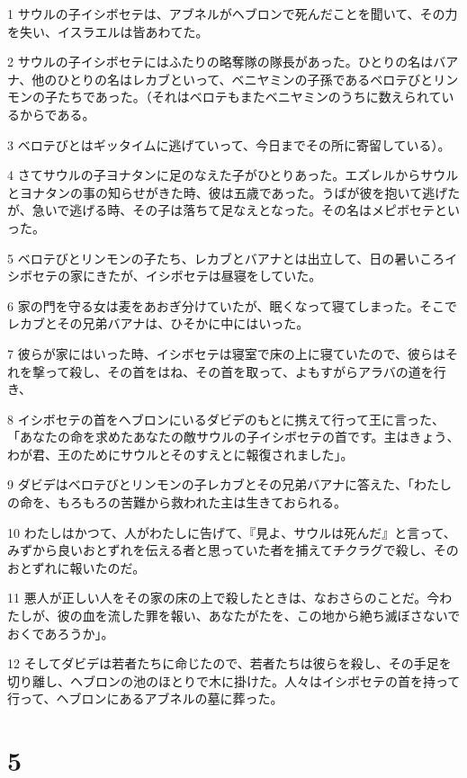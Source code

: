 \par 1 サウルの子イシボセテは、アブネルがヘブロンで死んだことを聞いて、その力を失い、イスラエルは皆あわてた。
\par 2 サウルの子イシボセテにはふたりの略奪隊の隊長があった。ひとりの名はバアナ、他のひとりの名はレカブといって、ベニヤミンの子孫であるベロテびとリンモンの子たちであった。（それはベロテもまたベニヤミンのうちに数えられているからである。
\par 3 ベロテびとはギッタイムに逃げていって、今日までその所に寄留している）。
\par 4 さてサウルの子ヨナタンに足のなえた子がひとりあった。エズレルからサウルとヨナタンの事の知らせがきた時、彼は五歳であった。うばが彼を抱いて逃げたが、急いで逃げる時、その子は落ちて足なえとなった。その名はメピボセテといった。
\par 5 ベロテびとリンモンの子たち、レカブとバアナとは出立して、日の暑いころイシボセテの家にきたが、イシボセテは昼寝をしていた。
\par 6 家の門を守る女は麦をあおぎ分けていたが、眠くなって寝てしまった。そこでレカブとその兄弟バアナは、ひそかに中にはいった。
\par 7 彼らが家にはいった時、イシボセテは寝室で床の上に寝ていたので、彼らはそれを撃って殺し、その首をはね、その首を取って、よもすがらアラバの道を行き、
\par 8 イシボセテの首をヘブロンにいるダビデのもとに携えて行って王に言った、「あなたの命を求めたあなたの敵サウルの子イシボセテの首です。主はきょう、わが君、王のためにサウルとそのすえとに報復されました」。
\par 9 ダビデはベロテびとリンモンの子レカブとその兄弟バアナに答えた、「わたしの命を、もろもろの苦難から救われた主は生きておられる。
\par 10 わたしはかつて、人がわたしに告げて、『見よ、サウルは死んだ』と言って、みずから良いおとずれを伝える者と思っていた者を捕えてチクラグで殺し、そのおとずれに報いたのだ。
\par 11 悪人が正しい人をその家の床の上で殺したときは、なおさらのことだ。今わたしが、彼の血を流した罪を報い、あなたがたを、この地から絶ち滅ぼさないでおくであろうか」。
\par 12 そしてダビデは若者たちに命じたので、若者たちは彼らを殺し、その手足を切り離し、ヘブロンの池のほとりで木に掛けた。人々はイシボセテの首を持って行って、ヘブロンにあるアブネルの墓に葬った。

\chapter{5}

